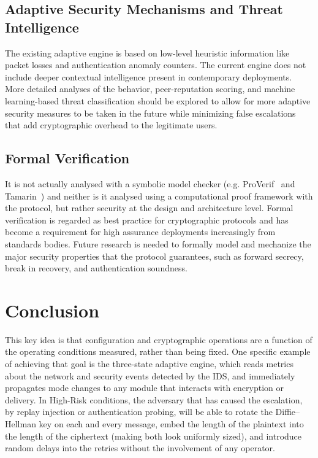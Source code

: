 \documentclass[conference]{IEEEtran}
\begin{document}
\subsection{Adaptive Security Mechanisms and Threat Intelligence}

The existing adaptive engine is based on low-level heuristic information like packet losses and authentication anomaly counters. The current engine does not include deeper contextual intelligence present in contemporary deployments. More detailed analyses of the behavior, peer-reputation scoring, and machine learning-based threat classification should be explored to allow for more adaptive security measures to be taken in the future while minimizing false escalations that add cryptographic overhead to the legitimate users.

\subsection{Formal Verification}

It is not actually analysed with a symbolic model checker (e.g. ProVerif~\cite{b11} and Tamarin~\cite{b12}) and neither is it analysed using a computational proof framework with the protocol, but rather security at the design and architecture level. Formal verification is regarded as best practice for cryptographic protocols and has become a requirement for high assurance deployments increasingly from standards bodies. Future research is needed to formally model and mechanize the major security properties that the protocol guarantees, such as forward secrecy, break in recovery, and authentication soundness.

\section{Conclusion}

This key idea is that configuration and cryptographic operations are a function of the operating conditions measured, rather than being fixed. One specific example of achieving that goal is the three-state adaptive engine, which reads metrics about the network and security events detected by the IDS, and immediately propagates mode changes to any module that interacts with encryption or delivery. In High-Risk conditions, the adversary that has caused the escalation, by replay injection or authentication probing, will be able to rotate the Diffie--Hellman key on each and every message, embed the length of the plaintext into the length of the ciphertext (making both look uniformly sized), and introduce random delays into the retries without the involvement of any operator.
\end{document}
